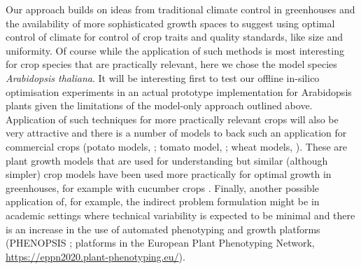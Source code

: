 
Our approach builds on ideas from traditional climate control in greenhouses and
the availability of more sophisticated growth spaces to suggest using optimal
control of climate for control of crop traits and quality standards, like size
and uniformity. Of course while the application of such methods is most
interesting for crop species that are practically relevant, here we chose the
model species \textit{Arabidopsis thaliana}. It will be interesting first to
test our offline in-silico optimisation experiments in an actual prototype
implementation for Arabidopsis plants given the limitations of the model-only
approach outlined above. Application of such techniques for more practically
relevant crops will also be very attractive and there is a number of models to
back such an application for commercial crops (potato models,
\cite{fleisher2017potato}; tomato model, \cite{heuvelink1999evaluation}; wheat
models, \cite{martre2015multimodel}). These are plant growth models that are
used for understanding but similar (although simpler) crop models have been used
more practically for optimal growth in greenhouses, for example with cucumber
crops \citep{Challa_1990}.  Finally, another possible application of, for
example, the indirect problem formulation might be in academic settings where
technical variability is expected to be minimal and there is an increase in the
use of automated phenotyping and growth platforms (PHENOPSIS
\cite{granier_phenopsis_2006}; platforms in the European Plant Phenotyping
Network, \url{https://eppn2020.plant-phenotyping.eu/}).

